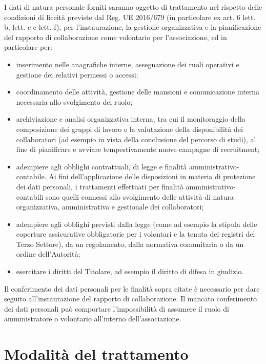 \documentclass[legal]{polinetwork}
\begin{document}
I dati di natura personale forniti saranno oggetto di trattamento nel rispetto delle condizioni di liceità previste dal Reg. UE 2016/679 (in particolare ex art. 6 lett. b, lett. c e lett. f), per l'instaurazione, la gestione organizzativa e la pianificazione del rapporto di collaborazione come volontario per l'associazione, ed in particolare per:

\begin{itemize}
	\item inserimento nelle anagrafiche interne, assegnazione dei ruoli operativi e gestione dei relativi permessi o accessi;
	\item coordinamento delle attività, gestione delle mansioni e comunicazione interna necessaria allo svolgimento del ruolo;
	\item archiviazione e analisi organizzativa interna, tra cui il monitoraggio della composizione dei gruppi di lavoro e la valutazione della disponibilità dei collaboratori (ad esempio in vista della conclusione del percorso di studi), al fine di pianificare e avviare tempestivamente nuove campagne di recruitment;
	\item adempiere agli obblighi contrattuali, di legge e finalità amministrativo-contabile. Ai fini dell'applicazione delle disposizioni in materia di protezione dei dati personali, i trattamenti effettuati per finalità amministrativo-contabili sono quelli connessi allo svolgimento delle attività di natura organizzativa, amministrativa e gestionale dei collaboratori;
	\item adempiere agli obblighi previsti dalla legge (come ad esempio la stipula delle coperture assicurative obbligatorie per i volontari e la tenuta dei registri del Terzo Settore), da un regolamento, dalla normativa comunitaria o da un ordine dell'Autorità;
	\item esercitare i diritti del Titolare, ad esempio il diritto di difesa in giudizio.
\end{itemize}

Il conferimento dei dati personali per le finalità sopra citate è necessario per dare seguito all'instaurazione del rapporto di collaborazione. Il mancato conferimento dei dati personali può comportare l'impossibilità di assumere il ruolo di amministratore o volontario all'interno dell'associazione.

\section{Modalità del trattamento}
\end{document}
